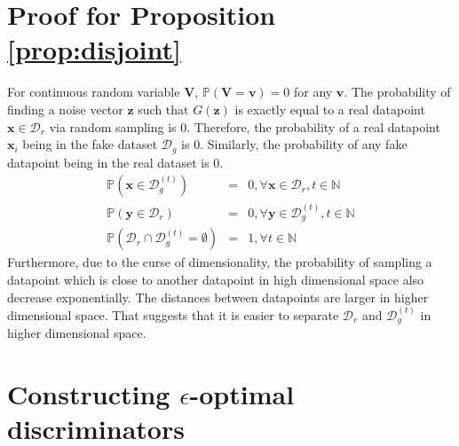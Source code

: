 \documentclass{article} %
\begin{document}
\appendix
\section{Proof for Proposition \ref{prop:disjoint}}
\label{appx:disjoint}
For continuous random variable $\bm V$, $\mathbb{P}(\bm  V= \bm v) = 0$ for any $\bm v$. The probability of finding a noise vector $\bm z$ such that $G(\bm z)$ is exactly equal to a real datapoint $\bm x \in \mathcal{D}_r$ via random sampling is 0. Therefore, the probability of a real datapoint $\bm x_i$ being in the fake dataset $\mathcal{D}_g$ is 0. Similarly, the probability of any fake datapoint being in the real dataset is 0. 
\begin{eqnarray}
\mathbb{P}(\bm x \in \mathcal{D}_g^{(t)}) & = & 0, \forall \bm x \in \mathcal{D}_r, t \in \mathbb{N} \nonumber \\
\mathbb{P}(\bm y \in \mathcal{D}_r) & = & 0, \forall \bm y \in \mathcal{D}_g^{(t)}, t \in \mathbb{N} \nonumber\\
\mathbb{P}(\mathcal{D}_r \cap \mathcal{D}_g^{(t)} = \emptyset) & = & 1, \forall t \in \mathbb{N} \label{eqn:disjoint}
\end{eqnarray}
Furthermore, due to the curse of dimensionality, the probability of sampling a datapoint which is close to another datapoint in high dimensional space also decrease exponentially. The distances between datapoints are larger in higher dimensional space. That suggests that it is easier to separate $\mathcal{D}_r$ and $\mathcal{D}_g^{(t)}$ in higher dimensional space.
\section{Constructing $\epsilon$-optimal discriminators}
\label{appx:constructOptimalD}
\end{document}
